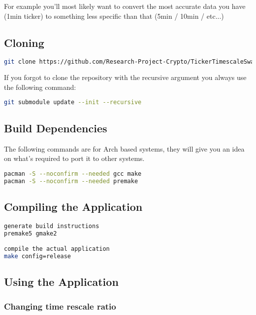 \documentclass[12pt,a4paper]{article}
\begin{document}
For example you'll most likely want to convert the most accurate data you have (1min ticker) to something less specific than that (5min / 10min / etc...)

\subsection{Cloning}

\begin{lstlisting}[language=bash]
git clone https://github.com/Research-Project-Crypto/TickerTimescaleSwap.git --recursive
\end{lstlisting}

If you forgot to clone the repository with the recursive argument you always use the following command:

\begin{lstlisting}[language=bash]
git submodule update --init --recursive
\end{lstlisting}

\subsection{Build Dependencies}

The following commands are for Arch based systems, they will give you an idea on what's required to port it to other systems.

\begin{lstlisting}[language=bash]
pacman -S --noconfirm --needed gcc make
pacman -S --noconfirm --needed premake
\end{lstlisting}

\subsection{Compiling the Application}

\begin{lstlisting}[language=bash]
generate build instructions
premake5 gmake2

compile the actual application
make config=release
\end{lstlisting}

\subsection{Using the Application}

\subsubsection{Changing time rescale ratio}
\end{document}
